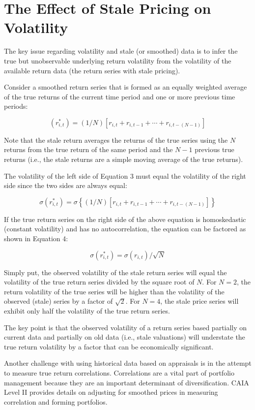 \documentclass[11pt]{article}
\begin{document}
\section*{The Effect of Stale Pricing on Volatility}
The key issue regarding volatility and stale (or smoothed) data is to infer the true but unobservable underlying return volatility from the volatility of the available return data (the return series with stale pricing).

Consider a smoothed return series that is formed as an equally weighted average of the true returns of the current time period and one or more previous time periods:


\begin{equation*}
\left(r_{i, t}^{*}\right)=(1 / N)\left[r_{i, t}+r_{i, t-1}+\cdots+r_{i, t-(N-1)}\right] \tag{3}
\end{equation*}


Note that the stale return averages the returns of the true series using the $N$ returns from the true return of the same period and the $N-1$ previous true returns (i.e., the stale returns are a simple moving average of the true returns).

The volatility of the left side of Equation 3 must equal the volatility of the right side since the two sides are always equal:

$$
\sigma\left(r_{i, t}^{*}\right)=\sigma\left\{(1 / N)\left[r_{i, t}+r_{i, t-1}+\cdots+r_{i, t-(N-1)}\right]\right\}
$$

If the true return series on the right side of the above equation is homoskedastic (constant volatility) and has no autocorrelation, the equation can be factored as shown in Equation 4:


\begin{equation*}
\sigma\left(r_{i, t}^{*}\right)=\sigma\left(r_{i, t}\right) / \sqrt{N} \tag{4}
\end{equation*}


Simply put, the observed volatility of the stale return series will equal the volatility of the true return series divided by the square root of $N$. For $N=2$, the return volatility of the true series will be higher than the volatility of the observed (stale) series by a factor of $\sqrt{2}$. For $N=4$, the stale price series will exhibit only half the volatility of the true return series.

The key point is that the observed volatility of a return series based partially on current data and partially on old data (i.e., stale valuations) will understate the true return volatility by a factor that can be economically significant.

Another challenge with using historical data based on appraisals is in the attempt to measure true return correlations. Correlations are a vital part of portfolio management because they are an important determinant of diversification. CAIA Level II provides details on adjusting for smoothed prices in measuring correlation and forming portfolios.
\end{document}
